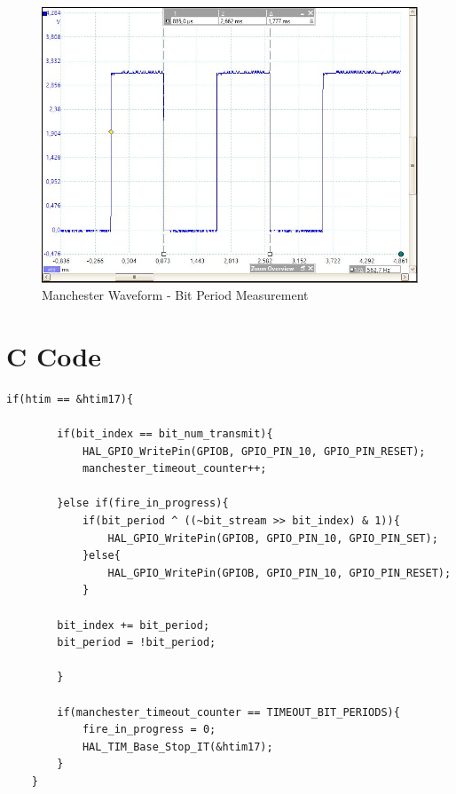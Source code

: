 \begin{figure}[H]
	\centering
	\includegraphics[width=.8\linewidth]{figures/results/manchester/delta_bit_period.JPG}
	\caption{Manchester Waveform - Bit Period Measurement}
	\label{fig:delta_bit_period}
\end{figure}

\section{C Code}

\begin{lstlisting}[style=cstyle, caption=Timer Interrupt Handler Implementation, label=lst:manchester_generate_interrupt_routine]
	if(htim == &htim17){
	
		if(bit_index == bit_num_transmit){
			HAL_GPIO_WritePin(GPIOB, GPIO_PIN_10, GPIO_PIN_RESET);
			manchester_timeout_counter++;
		
		}else if(fire_in_progress){
			if(bit_period ^ ((~bit_stream >> bit_index) & 1)){
				HAL_GPIO_WritePin(GPIOB, GPIO_PIN_10, GPIO_PIN_SET);
			}else{
				HAL_GPIO_WritePin(GPIOB, GPIO_PIN_10, GPIO_PIN_RESET);
			}
			
		bit_index += bit_period;
		bit_period = !bit_period;
		
		}
		
		if(manchester_timeout_counter == TIMEOUT_BIT_PERIODS){
			fire_in_progress = 0;
			HAL_TIM_Base_Stop_IT(&htim17);
		}
	}
\end{lstlisting}



